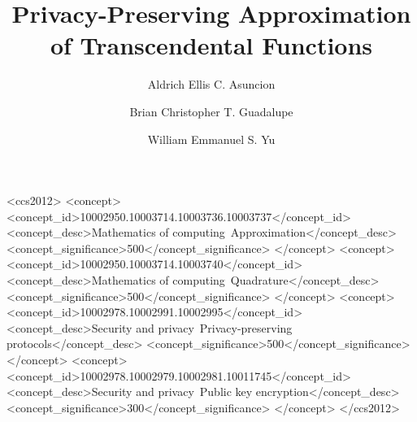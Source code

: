 \documentclass[sigconf,balance]{acmart}
\begin{document}
\title{Privacy-Preserving Approximation of Transcendental Functions}

\author{Aldrich Ellis C. Asuncion}

\author{Brian Christopher T. Guadalupe}

\author{William Emmanuel S. Yu}

\renewcommand{\shortauthors}{A. Asuncion, B. Guadalupe, and W. Yu}

\begin{abstract}

\end{abstract}

%
%
\begin{CCSXML}
    <ccs2012>
    <concept>
    <concept_id>10002950.10003714.10003736.10003737</concept_id>
    <concept_desc>Mathematics of computing~Approximation</concept_desc>
    <concept_significance>500</concept_significance>
    </concept>
    <concept>
    <concept_id>10002950.10003714.10003740</concept_id>
    <concept_desc>Mathematics of computing~Quadrature</concept_desc>
    <concept_significance>500</concept_significance>
    </concept>
    <concept>
    <concept_id>10002978.10002991.10002995</concept_id>
    <concept_desc>Security and privacy~Privacy-preserving protocols</concept_desc>
    <concept_significance>500</concept_significance>
    </concept>
    <concept>
    <concept_id>10002978.10002979.10002981.10011745</concept_id>
    <concept_desc>Security and privacy~Public key encryption</concept_desc>
    <concept_significance>300</concept_significance>
    </concept>
    </ccs2012>
\end{CCSXML}
\end{document}
